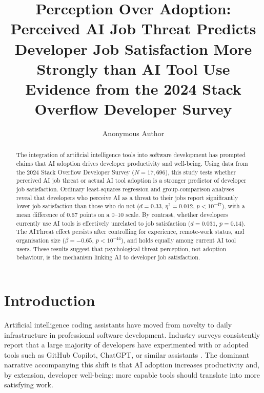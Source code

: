 \documentclass[11pt]{article}
\title{\textbf{Perception Over Adoption: Perceived AI Job Threat Predicts\\
Developer Job Satisfaction More Strongly than AI Tool Use}\\[0.4em]
\large Evidence from the 2024 Stack Overflow Developer Survey}
\author{Anonymous Author}
\date{}
\begin{document}
\maketitle

\begin{abstract}
The integration of artificial intelligence tools into software development has
prompted claims that AI adoption drives developer productivity and well-being.
Using data from the 2024 Stack Overflow Developer Survey ($N = 17{,}696$),
this study tests whether perceived AI job threat or actual AI tool adoption
is a stronger predictor of developer job satisfaction.
Ordinary least-squares regression and group-comparison analyses reveal that
developers who perceive AI as a threat to their jobs report significantly lower
job satisfaction than those who do not ($d = 0.33$, $\eta^2 = 0.012$,
$p < 10^{-47}$), with a mean difference of 0.67 points on a 0--10 scale.
By contrast, whether developers currently use AI tools is effectively
unrelated to job satisfaction ($d = 0.031$, $p = 0.14$).
The AIThreat effect persists after controlling for experience, remote-work
status, and organisation size ($\beta = -0.65$, $p < 10^{-44}$), and holds
equally among current AI tool users.
These results suggest that psychological threat perception, not adoption
behaviour, is the mechanism linking AI to developer job satisfaction.
\end{abstract}

\section{Introduction}

Artificial intelligence coding assistants have moved from novelty to daily
infrastructure in professional software development. Industry surveys
consistently report that a large majority of developers have experimented
with or adopted tools such as GitHub Copilot, ChatGPT, or similar assistants
\citep{vaillant2024developers}. The dominant narrative accompanying this shift
is that AI adoption increases productivity and, by extension, developer
well-being: more capable tools should translate into more satisfying work.
\end{document}
